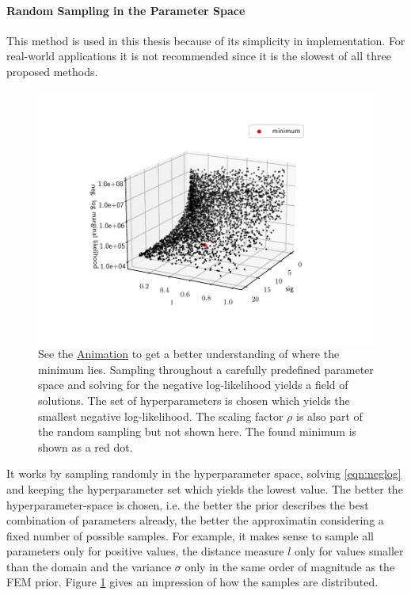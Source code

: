 \documentclass[%
  a4paper,oneside,%
  11pt,%
  smallchapters,
  style=printdev,
  extramargin,
  green,%
  rgb, <cmyk>
  ]{tubsbook}
\begin{document}
\paragraph{Random Sampling in the Parameter Space}
This method is used in this thesis because of its simplicity in implementation. For real-world applications it is not recommended since it is the slowest of all three proposed methods.
\begin{figure}[!ht]
\includegraphics[width=1\textwidth]{pics/RandomHyperParSearch.pdf}
\centering
\caption{See the \href{https://github.com/herluc/herluc.github.io/blob/main/MLL.gif}{Animation} to get a better understanding of where the minimum lies. Sampling throughout a carefully predefined parameter space and solving for the negative log-likelihood yields a field of solutions. The set of hyperparameters is chosen which yields the smallest negative log-likelihood. The scaling factor $\rho$ is also part of the random sampling but not shown here. The found minimum is shown as a red dot.}
\label{fig:RandSampHyper}
\end{figure}
It works by sampling randomly in the hyperparameter space, solving \ref{eqn:neglog} and keeping the hyperparameter set which yields the lowest value. The better the hyperparameter-space is chosen, i.e. the better the prior describes the best combination of parameters already, the better the approximatin considering a fixed number of possible samples. For example, it makes sense to sample all parameters only for positive values,  the distance measure $l$ only for values smaller than the domain and the variance $\sigma$ only in the same order of magnitude as the FEM prior. Figure \ref{fig:RandSampHyper} gives an impression of how the samples are distributed.
\end{document}
